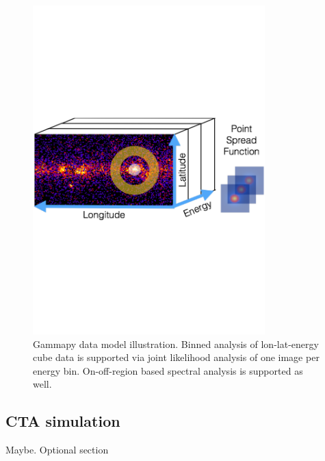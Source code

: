 \begin{figure}[t]
\centering
\includegraphics[width=0.8\textwidth]{figures/gammapy-cube-analysis}
\caption{
Gammapy data model illustration. Binned analysis of lon-lat-energy cube data is
supported via joint likelihood analysis of one image per energy bin.
On-off-region based spectral analysis is supported as well.
}
\label{fig:data-model}
\end{figure}

\subsection{CTA simulation}
\label{apps:sim}

Maybe. Optional section
